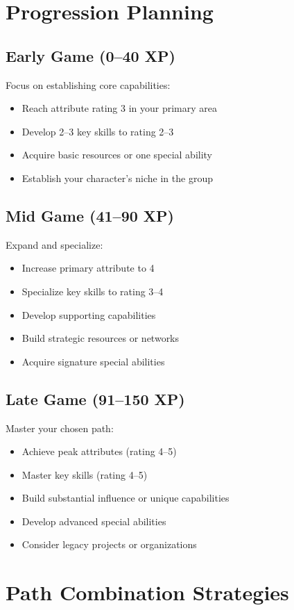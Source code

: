 \section{Progression Planning}

\subsection*{Early Game (0--40 XP)}
Focus on establishing core capabilities:
\begin{itemize}
\item Reach attribute rating 3 in your primary area
\item Develop 2--3 key skills to rating 2--3
\item Acquire basic resources or one special ability
\item Establish your character's niche in the group
\end{itemize}

\subsection*{Mid Game (41--90 XP)}
Expand and specialize:
\begin{itemize}
\item Increase primary attribute to 4
\item Specialize key skills to rating 3--4
\item Develop supporting capabilities
\item Build strategic resources or networks
\item Acquire signature special abilities
\end{itemize}

\subsection*{Late Game (91--150 XP)}
Master your chosen path:
\begin{itemize}
\item Achieve peak attributes (rating 4--5)
\item Master key skills (rating 4--5)
\item Build substantial influence or unique capabilities
\item Develop advanced special abilities
\item Consider legacy projects or organizations
\end{itemize}

\section{Path Combination Strategies}

